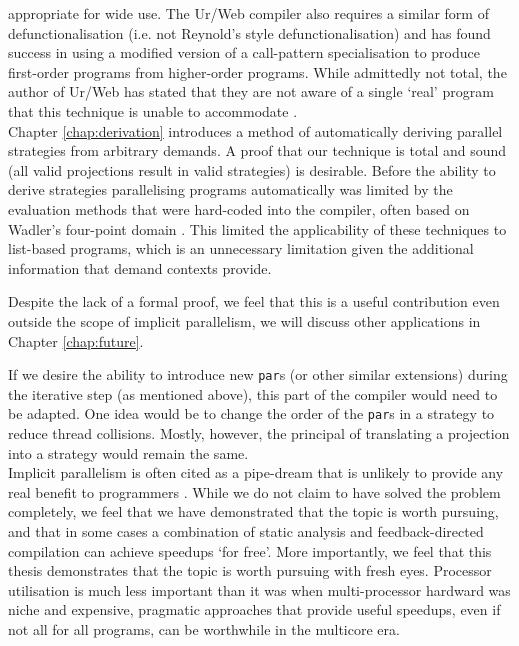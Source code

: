 appropriate for wide use. The Ur/Web compiler also requires a similar form of
defunctionalisation (i.e. not Reynold's style defunctionalisation)
\citep{ur-web} and has found success in using a modified version of a
call-pattern specialisation \citep{call-pattern-spec} to produce first-order
programs from higher-order programs. While admittedly not total, the author of
Ur/Web has stated that they are not aware of a single `real' program that this
technique is unable to accommodate \citep{chlipala}.
\\[0.35cm]
Chapter \ref{chap:derivation} introduces a method of automatically deriving
parallel strategies from arbitrary demands. A proof that our technique is total
and sound (all valid projections result in valid strategies) is desirable.
Before the ability to derive strategies parallelising programs automatically
was limited by the evaluation methods that were hard-coded into the compiler, often
based on Wadler's four-point domain \citep{hogen1992automatic, burn1987evaluation}.
This limited the applicability of these techniques to list-based programs, which
is an unnecessary limitation given the additional information that demand contexts
provide.

Despite the lack of a formal proof, we feel that this is a useful contribution
even outside the scope of implicit parallelism, we will discuss other
applications in Chapter \ref{chap:future}.

If we desire the ability to introduce new \verb|par|s (or other similar
extensions) during the iterative step (as mentioned above), this part of the
compiler would need to be adapted. One idea would be to change the order of the
\verb|par|s in a strategy to reduce thread collisions. Mostly, however, the
principal of translating a projection into a strategy would remain the same.
\\[0.35cm]
Implicit parallelism is often cited as a pipe-dream that is unlikely to provide
any real benefit to programmers \citep{spjQuote1999, marlowBook, benEmail,
hammond2000research}.  While we do not claim to have solved the problem
completely, we feel that we have demonstrated that the topic is worth pursuing,
and that in some cases a combination of static analysis and feedback-directed
compilation can achieve speedups `for free'. More importantly, we feel that
this thesis demonstrates that the topic is worth pursuing with fresh eyes.
Processor utilisation is much less important than it was when multi-processor
hardward was niche and expensive, pragmatic approaches that provide useful
speedups, even if not all for all programs, can be worthwhile in the multicore
era.
